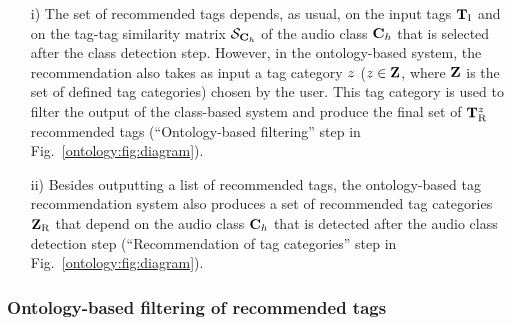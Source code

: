 \begin{itemize}
\item[i)] The set of recommended tags depends, as usual, on the input tags $\mathbf{T}_{\text{I}}$ and on the tag-tag similarity matrix $\mathcal{S}_{\mathbf{C}_{h}}$ of the audio class $\mathbf{C}_{h}$ that is selected after the class detection step. However, in the ontology-based system, the recommendation also takes as input a tag category $z$ ($z \in \mathbf{Z}$, where $\mathbf{Z}$ is the set of defined tag categories) chosen by the user. %
This tag category is used to filter the output of the class-based system and produce the final set of $\mathbf{T}_{\text{R}}^z$ recommended tags (``Ontology-based filtering'' step in Fig.~\ref{ontology:fig:diagram}).

\item[ii)] Besides outputting a list of recommended tags, the ontology-based tag recommendation system also produces a set of recommended tag categories $\mathbf{Z}_\text{R}$ that depend on the audio class $\mathbf{C}_{h}$ that is detected after the audio class detection step (``Recommendation of tag categories'' step in Fig.~\ref{ontology:fig:diagram}).
\end{itemize} 


\subsubsection{Ontology-based filtering of recommended tags}

